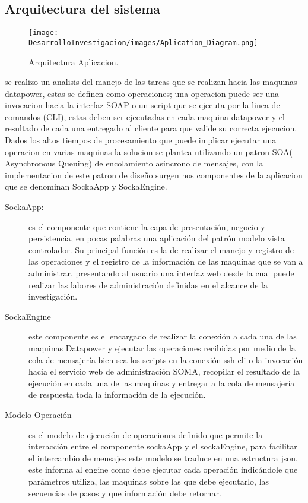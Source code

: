 \subsection{Arquitectura del sistema}
\begin{figure}[th!]
    \centering
    \texttt{[image: DesarrolloInvestigacion/images/Aplication\_Diagram.png]}
    \caption{Arquitectura Aplicacion.}
\end{figure}
se realizo un analisis del manejo de las tareas que se realizan hacia las maquinas datapower, estas se definen como operaciones; una operacion puede ser una invocacion hacia la interfaz SOAP o un script que se ejecuta por la linea de comandos (CLI), estas deben ser ejecutadas en cada maquina datapower y el resultado de cada una entregado al cliente para que valide su correcta ejecucion.
\newline
Dados los altos tiempos de procesamiento que puede implicar ejecutar una operacion en varias maquinas la solucion se plantea utilizando un patron SOA( \cite{o16} Asynchronous Queuing) de encolamiento asincrono de mensajes, con la implementacion de este patron de diseño surgen nos componentes de la aplicacion que se denominan SockaApp y SockaEngine.
\newline
\begin{description}	
    \item [SockaApp:] es el componente que contiene la capa de presentación, negocio y persistencia, en pocas palabras una aplicación del patrón modelo vista controlador. Su principal función es la de realizar el manejo y registro de las operaciones y el registro de la información de las maquinas que se van a administrar, presentando al usuario una interfaz web desde la cual puede realizar las labores de administración definidas en el alcance de la investigación.

    \item [SockaEngine] este componente es el encargado de realizar la conexión a cada una de las maquinas Datapower y ejecutar las operaciones recibidas por medio de la cola de mensajería bien sea los scripts en la conexión ssh-cli o la invocación hacia el servicio web de administración SOMA, recopilar el resultado de la ejecución en cada una de las maquinas y entregar a la cola de mensajería de respuesta toda la información de la ejecución.

    \item [Modelo Operación] es el modelo de ejecución de operaciones definido que permite la interacción entre el componente sockaApp y el sockaEngine, para facilitar el intercambio de mensajes este modelo se traduce en una estructura json, este informa al engine como debe ejecutar cada operación indicándole que parámetros utiliza, las maquinas sobre las que debe ejecutarlo, las secuencias de pasos y que información debe retornar.
\end{description}
